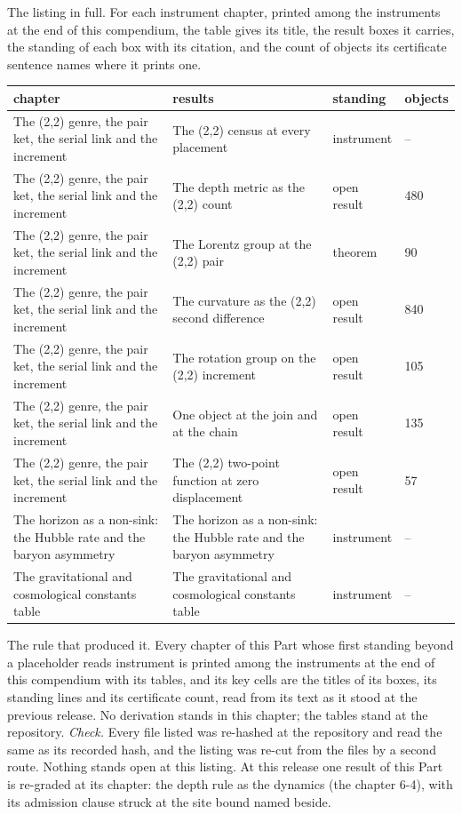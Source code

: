 \begin{chproof}[instrument]
The listing in full. For each instrument chapter, printed among the instruments at the end of this compendium, the table gives its title, the result boxes it carries, the standing of each box with its citation, and the count of objects its certificate sentence names where it prints one.
{\small
\begin{longtable}{p{38mm}p{63mm}p{30mm}p{14mm}}
\hline
chapter & results & standing & objects \\
\hline
\endhead
The (2,2) genre, the pair ket, the serial link and the increment & The (2,2) census at every placement & instrument & -- \\
The (2,2) genre, the pair ket, the serial link and the increment & The depth metric as the (2,2) count & open result & 480 \\
The (2,2) genre, the pair ket, the serial link and the increment & The Lorentz group at the (2,2) pair & theorem & 90 \\
The (2,2) genre, the pair ket, the serial link and the increment & The curvature as the (2,2) second difference & open result & 840 \\
The (2,2) genre, the pair ket, the serial link and the increment & The rotation group on the (2,2) increment & open result & 105 \\
The (2,2) genre, the pair ket, the serial link and the increment & One object at the join and at the chain & open result & 135 \\
The (2,2) genre, the pair ket, the serial link and the increment & The (2,2) two-point function at zero displacement & open result & 57 \\
The horizon as a non-sink: the Hubble rate and the baryon asymmetry & The horizon as a non-sink: the Hubble rate and the baryon asymmetry & instrument & -- \\
The gravitational and cosmological constants table & The gravitational and cosmological constants table & instrument & -- \\
\hline
\end{longtable}
}
The rule that produced it. Every chapter of this Part whose first standing beyond a placeholder reads instrument is printed among the instruments at the end of this compendium with its tables, and its key cells are the titles of its boxes, its standing lines and its certificate count, read from its text as it stood at the previous release.
No derivation stands in this chapter; the tables stand at the repository.
\emph{Check.} Every file listed was re-hashed at the repository and read the same as its recorded hash, and the listing was re-cut from the files by a second route.
Nothing stands open at this listing. At this release one result of this Part is re-graded at its chapter: the depth rule as the dynamics (the chapter 6-4), with its admission clause struck at the site bound named beside.
\end{chproof}
\label{chend:VI-L-the-instrument-tables-at-the-repository}
